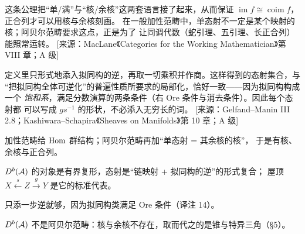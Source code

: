 \begin{yizhu}[为什么“单态射=其余核的核”是阿贝尔范畴的关键]
这条公理把“单/满”与“核/余核”这两套语言接了起来，从而保证
$\operatorname{im}f\cong\operatorname{coim}f$，正合列才可以用核与余核刻画。
在一般加性范畴中，单态射不一定是某个映射的核；阿贝尔范畴要求这点，正是为了
让同调代数（蛇引理、五引理、长正合列）能照常运转。
[来源：MacLane《Categories for the Working Mathematician》第 VIII 章；A 级]
\end{yizhu}

\begin{yizhu}
定义里只形式地添入拟同构的逆，再取一切乘积并作商。这样得到的态射集合，与
“把拟同构全体可逆化”的普遍性质所要求的局部化，恰好一致——因为拟同构构成一个
\emph{饱和系}，满足分数演算的两条条件（右 Ore 条件与消去条件）。因此每个态射都
可以写成 $g s^{-1}$ 的形状，不必添入无穷长的词。
[来源：Gelfand--Manin III 2.8；Kashiwara--Schapira《Sheaves on Manifolds》第 10 章；A 级]
\end{yizhu}

\begin{keytakeaways}
  \item 加性范畴给 $\operatorname{Hom}$ 群结构；阿贝尔范畴再加“单态射 = 其余核的核”，
        于是有核、余核与正合列。
  \item $D^b(\mathcal{A})$ 的对象是有界复形，态射是“链映射 + 拟同构的逆”的形式复合；
        屋顶 $X\xleftarrow{s}Z\xrightarrow{g}Y$ 是它的标准代表。
  \item 只添一步逆就够，因为拟同构类满足 Ore 条件（译注 14）。
  \item $D^b(\mathcal{A})$ 不是阿贝尔范畴：核与余核不存在，取而代之的是锥与特异三角（§5）。
\end{keytakeaways}
